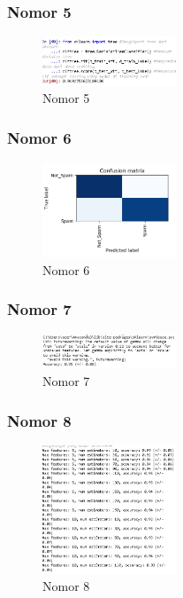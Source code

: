 \subsubsection{Nomor 5}
\hfill\break

\begin{figure}[H]
\centering
\includegraphics[width=4cm]{figures/1174079/4/soal5.PNG}
\caption{Nomor 5}
\end{figure}

\subsubsection{Nomor 6}
\hfill\break

\begin{figure}[H]
\centering
\includegraphics[width=4cm]{figures/1174079/4/soal6.PNG}
\caption{Nomor 6}
\end{figure}

\subsubsection{Nomor 7}
\hfill\break

\begin{figure}[H]
\centering
\includegraphics[width=4cm]{figures/1174079/4/soal7.PNG}
\caption{Nomor 7}
\end{figure}

\subsubsection{Nomor 8}
\hfill\break

\begin{figure}[H]
\centering
\includegraphics[width=4cm]{figures/1174079/4/soal8.PNG}
\caption{Nomor 8}
\end{figure}

